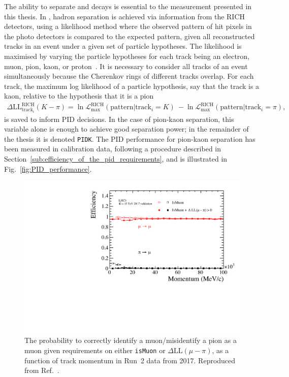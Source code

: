 The ability to separate \BtoDK and \BtoDpi decays is essential to the measurement presented in this thesis. In \lhcb, hadron separation is achieved via information from the RICH detectors, using a likelihood method where the observed pattern of hit pixels in the photo detectors is compared to the expected pattern, given all reconstructed tracks in an event under a given set of particle hypotheses. The likelihood is maximised by varying the particle hypotheses for each track being an electron, muon, pion, kaon, or proton~\cite{Forty:684714}.  It is necessary to consider all tracks of an event simultaneously because the Cherenkov rings of different tracks overlap. For each track, the maximum log likelihood of a particle hypothesis, say that the track is a kaon, relative to the hypothesis that it is a pion
\begin{align}\label{eq:DLL}
    \Delta\text{LL}_{\text{track}_i}^\text{RICH}(K-\pi) =  \ln \mathcal L_\text{max}^\text{RICH}(\text{pattern}|\text{track}_i = K)\ - \ln \mathcal L_\text{max}^\text{RICH}(\text{pattern}|\text{track}_i = \pi),
\end{align}
is saved to inform PID decisions. In the case of pion-kaon separation, this variable alone is enough to achieve good separation power; in the remainder of the thesis it is denoted \texttt{PIDK}. The PID performance for pion-kaon separation has been measured in calibration data, following a procedure described in Section~\ref{sub:efficiency_of_the_pid_requirements}, and is illustrated in Fig.~\ref{fig:PID_performance}.

\begin{figure}[tb]
    \centering
    \includegraphics[width=0.60\columnwidth]{figures/detector/PIDmu_Run2.pdf}
    \caption{The probability to correctly identify a muon/misidentify a pion as a muon given requirements on either \texttt{isMuon} or $\Delta \mathrm{LL}(\mu-\pi)$, as a function of track momentum in Run~2 data from 2017. Reproduced from Ref.~\cite{PIDplots}.}
    \label{fig:PIDmu_performance}
\end{figure}

